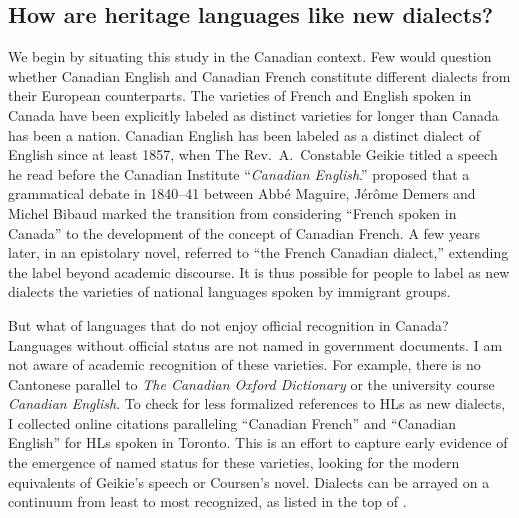 \documentclass[output=paper]{LSP/langsci}
\begin{document}
\subsection{How are heritage languages like new dialects?}
We begin by situating this study in the Canadian context. Few would question whether Canadian English and Canadian French constitute different dialects from their European counterparts. The varieties of French and English spoken in Canada have been explicitly labeled as distinct varieties for longer than Canada has been a nation. Canadian English has been labeled as a distinct dialect of English since at least 1857, when The Rev.\ A.\ Constable Geikie titled a speech he read before the Canadian Institute “\textit{Canadian English}.” \citet{bouchard_langue_1998} proposed that a grammatical debate in 1840--41 between Abbé Maguire, Jérôme Demers and Michel Bibaud marked the transition from considering “French spoken in Canada” to the development of the concept of Canadian French. A few years later, in an epistolary novel, \citet{coursen_it_1846} referred to “the French Canadian dialect,” extending the label beyond academic discourse. It is thus possible for people to label as new dialects the varieties of national languages spoken by immigrant groups. 

But what of languages that do not enjoy official recognition in Canada? Languages without official status are not named in government documents. I am not aware of academic recognition of these varieties. For example, there is no Cantonese parallel to \textit{The Canadian Oxford Dictionary} or the university course \textit{Canadian English}. To check for less formalized references to HLs as new dialects, I collected online citations paralleling “Canadian French” and “Canadian English” for HLs spoken in Toronto. This is an effort to capture early evidence of the emergence of named status for these varieties, looking for the modern equivalents of Geikie’s speech or Coursen’s novel. Dialects can be arrayed on a continuum from least to most recognized, as listed in the top of .
\end{document}
